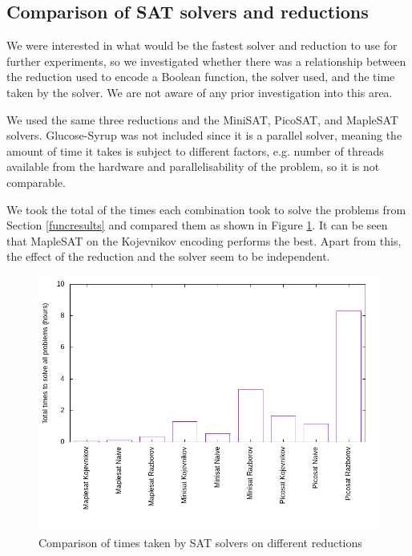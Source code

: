 \documentclass{article}
\begin{document}
\subsection{Comparison of SAT solvers and reductions} \label{satresults}

We were interested in what would be the fastest solver and reduction to use for further experiments, so we investigated whether there was a relationship between the reduction used to encode a Boolean function, the solver used, and the time taken by the solver. We are not aware of any prior investigation into this area.

We used the same three reductions and the MiniSAT, PicoSAT, and MapleSAT solvers. Glucose-Syrup was not included since it is a parallel solver, meaning the amount of time it takes is subject to different factors, e.g. number of threads available from the hardware and parallelisability of the problem, so it is not comparable.

We took the total of the times each combination took to solve the problems from Section \ref{funcresults} and compared them as shown in Figure \ref{fig:totals}. It can be seen that MapleSAT on the Kojevnikov encoding performs the best. Apart from this, the effect of the reduction and the solver seem to be independent.

\begin{figure}[h!]
  \includegraphics[width=\textwidth]{images/totals.png}
  \caption{Comparison of times taken by SAT solvers on different reductions}
  \label{fig:totals}
\end{figure}
\end{document}
